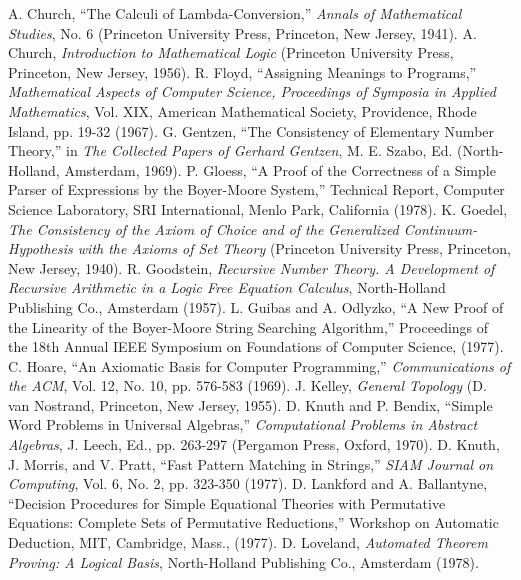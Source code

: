 \documentclass[11pt]{book}
\newcommand{\pubinlineunderline}[1]{\emph{#1}}
\begin{document}
\begin{thebibliography}{99}
 A. Church, ``The Calculi of Lambda-Conversion,'' \pubinlineunderline{Annals of Mathematical Studies}, No. 6 (Princeton University Press, Princeton, New Jersey, 1941).
 A. Church, \pubinlineunderline{Introduction to Mathematical Logic} (Princeton University Press, Princeton, New Jersey, 1956).
 R. Floyd, ``Assigning Meanings to Programs,'' \pubinlineunderline{Mathematical Aspects of Computer Science, Proceedings of Symposia in Applied Mathematics}, Vol. XIX, American Mathematical Society, Providence, Rhode Island, pp. 19-32 (1967).
 G. Gentzen, ``The Consistency of Elementary Number Theory,'' in \pubinlineunderline{The Collected Papers of Gerhard Gentzen}, M. E. Szabo, Ed. (North-Holland, Amsterdam, 1969).
 P. Gloess, ``A Proof of the Correctness of a Simple Parser of Expressions by the Boyer-Moore System,'' Technical Report, Computer Science Laboratory, SRI International, Menlo Park, California (1978).
 K. Goedel, \pubinlineunderline{The Consistency of the Axiom of Choice and of the Generalized Continuum-Hypothesis with the Axioms of Set Theory} (Princeton University Press, Princeton, New Jersey, 1940).
 R. Goodstein, \pubinlineunderline{Recursive Number Theory.  A Development of Recursive Arithmetic in a Logic Free Equation Calculus}, North-Holland Publishing Co., Amsterdam (1957).
 L. Guibas and A. Odlyzko, ``A New Proof of the Linearity of the Boyer-Moore String Searching Algorithm,'' Proceedings of the 18th Annual IEEE Symposium on Foundations of Computer Science, (1977).
 C. Hoare, ``An Axiomatic Basis for Computer Programming,'' \pubinlineunderline{Communications of the ACM}, Vol. 12, No. 10, pp. 576-583 (1969).
 J. Kelley, \pubinlineunderline{General Topology} (D. van Nostrand, Princeton, New Jersey, 1955).
 D. Knuth and P. Bendix, ``Simple Word Problems in Universal Algebras,'' \pubinlineunderline{Computational Problems in Abstract Algebras}, J. Leech, Ed., pp. 263-297  (Pergamon Press, Oxford, 1970).
 D. Knuth, J. Morris, and V. Pratt, ``Fast Pattern Matching in Strings,'' \pubinlineunderline{SIAM Journal on Computing}, Vol. 6, No. 2, pp. 323-350 (1977).
 D. Lankford and A. Ballantyne, ``Decision Procedures for Simple Equational Theories with Permutative Equations:  Complete Sets of Permutative Reductions,'' Workshop on Automatic Deduction, MIT, Cambridge, Mass., (1977).
 D. Loveland, \pubinlineunderline{Automated Theorem Proving: A Logical Basis}, North-Holland Publishing Co., Amsterdam (1978).

\end{thebibliography}
\end{document}

